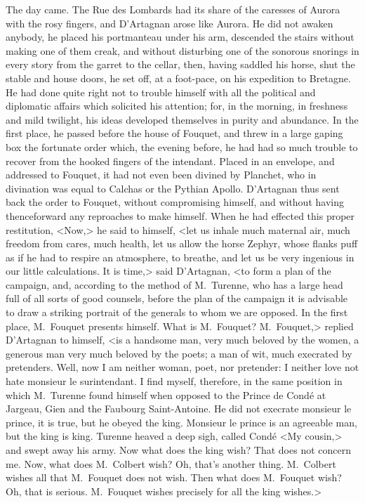 The day came. The Rue des Lombards had its share of the caresses of Aurora with the rosy fingers, and D'Artagnan arose like Aurora. He did not awaken anybody, he placed his portmanteau under his arm, descended the stairs without making one of them creak, and without disturbing one of the sonorous snorings in every story from the garret to the cellar, then, having saddled his horse, shut the stable and house doors, he set off, at a foot-pace, on his expedition to Bretagne. He had done quite right not to trouble himself with all the political and diplomatic affairs which solicited his attention; for, in the morning, in freshness and mild twilight, his ideas developed themselves in purity and abundance. In the first place, he passed before the house of Fouquet, and threw in a large gaping box the fortunate order which, the evening before, he had had so much trouble to recover from the hooked fingers of the intendant. Placed in an envelope, and addressed to Fouquet, it had not even been divined by Planchet, who in divination was equal to Calchas or the Pythian Apollo. D'Artagnan thus sent back the order to Fouquet, without compromising himself, and without having thenceforward any reproaches to make himself. When he had effected this proper restitution, <Now,> he said to himself, <let us inhale much maternal air, much freedom from cares, much health, let us allow the horse Zephyr, whose flanks puff as if he had to respire an atmosphere, to breathe, and let us be very ingenious in our little calculations. It is time,> said D'Artagnan, <to form a plan of the campaign, and, according to the method of M.~Turenne, who has a large head full of all sorts of good counsels, before the plan of the campaign it is advisable to draw a striking portrait of the generals to whom we are opposed. In the first place, M.~Fouquet presents himself. What is M.~Fouquet? M.~Fouquet,> replied D'Artagnan to himself, <is a handsome man, very much beloved by the women, a generous man very much beloved by the poets; a man of wit, much execrated by pretenders. Well, now I am neither woman, poet, nor pretender: I neither love not hate monsieur le surintendant. I find myself, therefore, in the same position in which M.~Turenne found himself when opposed to the Prince de Condé at Jargeau, Gien and the Faubourg Saint-Antoine. He did not execrate monsieur le prince, it is true, but he obeyed the king. Monsieur le prince is an agreeable man, but the king is king. Turenne heaved a deep sigh, called Condé <My cousin,> and swept away his army. Now what does the king wish? That does not concern me. Now, what does M.~Colbert wish? Oh, that's another thing. M.~Colbert wishes all that M.~Fouquet does not wish. Then what does M.~Fouquet wish? Oh, that is serious. M.~Fouquet wishes precisely for all the king wishes.>

